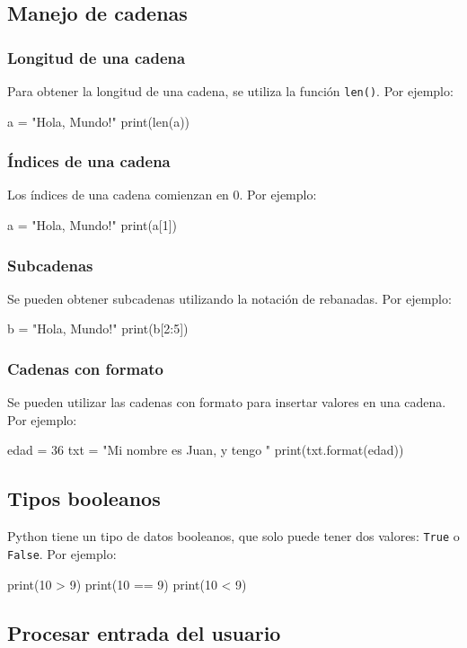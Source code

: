 \documentclass{article}
\begin{document}
\subsection{Manejo de cadenas}
\subsubsection{Longitud de una cadena}
Para obtener la longitud de una cadena, se utiliza la función \texttt{len()}. Por ejemplo:
\begin{python_code}
a = "Hola, Mundo!"
print(len(a))
\end{python_code}
\subsubsection{Índices de una cadena}
Los índices de una cadena comienzan en 0. Por ejemplo:
\begin{python_code}
a = "Hola, Mundo!"
print(a[1])
\end{python_code}
\subsubsection{Subcadenas}
Se pueden obtener subcadenas utilizando la notación de rebanadas. Por ejemplo:
\begin{python_code}
b = "Hola, Mundo!"
print(b[2:5])
\end{python_code}
\subsubsection{Cadenas con formato}
Se pueden utilizar las cadenas con formato para insertar valores en una cadena. Por ejemplo:
\begin{python_code}
edad = 36
txt = "Mi nombre es Juan, y tengo {}"
print(txt.format(edad))
\end{python_code}

\subsection{Tipos booleanos}
Python tiene un tipo de datos booleanos, que solo puede tener dos valores: \texttt{True} o \texttt{False}. Por ejemplo:
\begin{python_code}
print(10 > 9)
print(10 == 9)
print(10 < 9)
\end{python_code}

\subsection{Procesar entrada del usuario}
\end{document}
